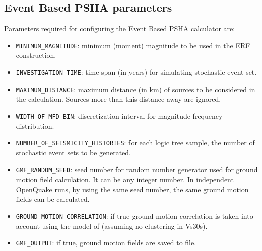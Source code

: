 \subsection{Event Based PSHA parameters}
Parameters required for configuring the Event Based PSHA calculator are:
\begin{itemize}
\item \Verb+MINIMUM_MAGNITUDE+: minimum (moment) magnitude to be used in the ERF construction.
\item \Verb+INVESTIGATION_TIME+: time span (in years) for simulating stochastic event set.
\item \Verb+MAXIMUM_DISTANCE+: maximum distance (in km) of sources to be considered in the calculation. Sources more than this distance away are ignored.
\item \Verb+WIDTH_OF_MFD_BIN+: discretization interval for  magnitude-frequency distribution.
\item \Verb+NUMBER_OF_SEISMICITY_HISTORIES+: for each logic tree sample, the number of stochastic event sets to be generated.
\item \Verb+GMF_RANDOM_SEED+: seed number for random number generator used for ground motion field calculation. It can be any integer number. In independent OpenQuake runs, by using the same seed number, the same ground motion fields can be calculated.
\item \Verb+GROUND_MOTION_CORRELATION+: if true ground motion correlation is taken into account using the model of \cite{Jayaram2009} (assuming no clustering in Vs30s).
\item \Verb+GMF_OUTPUT+: if true, ground motion fields are saved to file.
\end{itemize}

